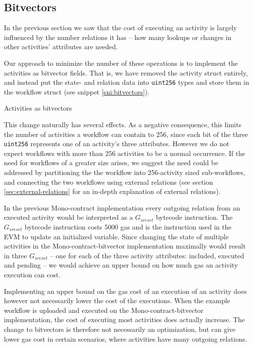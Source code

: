 \documentclass{article}
\begin{document}
		\subsection{Bitvectors}
		In the previous section we saw that the cost of executing an activity is largely influenced by the number relations it has -- how many lookups or changes in other activities' attributes are needed.
		
		Our approach to minimize the number of these operations is to implement the activities as bitvector fields. 
		That is, we have removed the activity struct entirely, and instead put the state- and relation data into \texttt{uint256} types and store them in the workflow struct (see snippet \ref{sni:bitvectors}).
		
		\begin{snippet}[ht!]
			\centering
			
		 	\caption[Activities as bitvectors]
		 	{Activities as bitvectors}
		 	\label{sni:bitvectors}
		\end{snippet}

		This change naturally has several effects.
		As a negative consequence, this limits the number of activities a workflow can contain to 256, since each bit of the three \texttt{uint256} represents one of an activity's three attributes.
		However we do not expect workflows with more than 256 activities to be a normal occurrence.
		If the need for workflows of a greater size arises, we suggest the need could be addressed by partitioning the the workflow into 256-activity sized sub-workflows, and connecting the two workflows using external relations (see section \ref{sec:external-relations} for an in-depth explanation of external relations).
 
		In the previous Mono-contract implementation every outgoing relation from an executed activity would be interpreted as a $G_{sreset}$ bytecode instruction.
		The $G_{sreset}$ bytecode instruction costs 5000 gas and is the instruction used in the EVM to update an initialized variable. 
		Since changing the state of multiple activities in the Mono-contract-bitvector implementation maximally would result in three $G_{sreset}$ -- one for each of the three activity attributes: included, executed and pending -- we would achieve an upper bound on how much gas an activity execution can cost.

		Implementing an upper bound on the gas cost of an execution of an activity does however not necessarily lower the cost of the executions.
		When the example workflow is uploaded and executed on the Mono-contract-bitvector implementation, the cost of executing most activities does actually increase.
		The change to bitvectors is therefore not necessarily an optimization, but can give lower gas cost in certain scenarios, where activities have many outgoing relations. 
\end{document}
